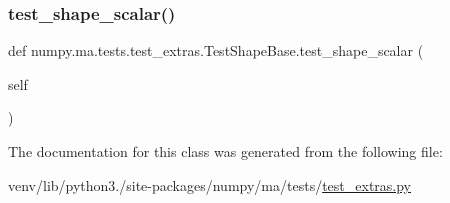 \mbox{\label{classnumpy_1_1ma_1_1tests_1_1test__extras_1_1TestShapeBase_a7f2ad694b13bcad5950cd9be67246be2}} 
\subsubsection{\texorpdfstring{test\+\_\+shape\+\_\+scalar()}{test\_shape\_scalar()}}
{\footnotesize\ttfamily def numpy.\+ma.\+tests.\+test\+\_\+extras.\+Test\+Shape\+Base.\+test\+\_\+shape\+\_\+scalar (\begin{DoxyParamCaption}\item[{}]{self }\end{DoxyParamCaption})}



The documentation for this class was generated from the following file\+:\begin{DoxyCompactItemize}
\item 
venv/lib/python3./site-\/packages/numpy/ma/tests/\hyperlink{test__extras_8py}{test\+\_\+extras.\+py}\end{DoxyCompactItemize}
